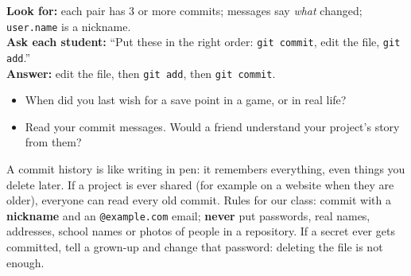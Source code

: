 \begin{formativecheck}
\textbf{Look for:} each pair has 3 or more commits; messages say \emph{what} changed; \texttt{user.name} is a nickname.\\
\textbf{Ask each student:} \enquote{Put these in the right order: \texttt{git commit}, edit the file, \texttt{git add}.}\\
\textbf{Answer:} edit the file, then \texttt{git add}, then \texttt{git commit}.
\end{formativecheck}

\begin{reflection}
\begin{itemize}[itemsep=1pt]
  \item When did you last wish for a save point in a game, or in real life?
  \item Read your commit messages. Would a friend understand your project's story from them?
\end{itemize}
\end{reflection}

\begin{safety}
A commit history is like writing in pen: it remembers everything, even things you delete later. If a project is ever shared (for example on a website when they are older), everyone can read every old commit. Rules for our class: commit with a \textbf{nickname} and an \texttt{@example.com} email; \textbf{never} put passwords, real names, addresses, school names or photos of people in a repository. If a secret ever gets committed, tell a grown-up and change that password: deleting the file is not enough.
\end{safety}


